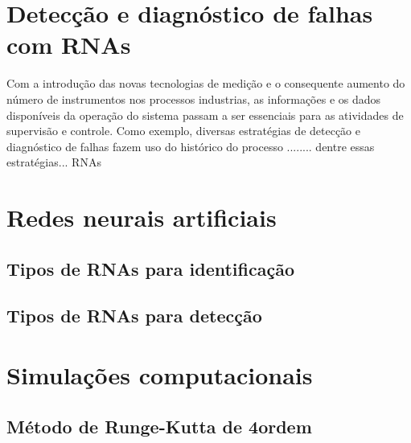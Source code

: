 \section{Detecção e diagnóstico de falhas com RNAs}

Com a introdução das novas tecnologias de medição e o consequente aumento do
número de instrumentos nos processos industrias, as informações e os dados
disponíveis da operação do sistema passam a ser essenciais para as atividades de
supervisão e controle. Como exemplo, diversas estratégias de detecção e
diagnóstico de falhas fazem uso do histórico do processo ........ dentre essas
estratégias... RNAs

\section{Redes neurais artificiais}

\subsection{Tipos de RNAs para identificação}

\subsection{Tipos de RNAs para detecção}

\section{Simulações computacionais}

\subsection{Método de Runge-Kutta de 4\textordfeminine ordem}
